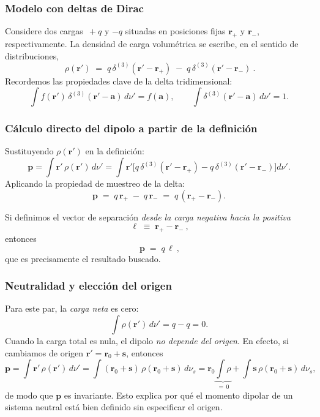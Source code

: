 \documentclass{article}
\begin{document}
\subsubsection*{Modelo con deltas de Dirac}
Considere dos cargas $\,+q$ y $-q$ situadas en posiciones fijas $\mathbf r_{+}$ y $\mathbf r_{-}$, respectivamente. La densidad de carga volumétrica se escribe, en el sentido de distribuciones,
\[
\boxed{\ \rho(\mathbf r') \;=\; q\,\delta^{(3)}(\mathbf r'-\mathbf r_{+})
\;-\; q\,\delta^{(3)}(\mathbf r'-\mathbf r_{-})\ }.
\]
Recordemos las propiedades clave de la delta tridimensional:
\[
\int f(\mathbf r')\,\delta^{(3)}(\mathbf r'-\mathbf a)\,d\nu' = f(\mathbf a),
\qquad
\int \delta^{(3)}(\mathbf r'-\mathbf a)\,d\nu' = 1.
\]

\subsubsection*{Cálculo directo del dipolo a partir de la definición}
Sustituyendo $\rho(\mathbf r')$ en la definición:
\[
\mathbf p
=\int \mathbf r'\,\rho(\mathbf r')\,d\nu'
=\int \mathbf r'\Big[q\,\delta^{(3)}(\mathbf r'-\mathbf r_{+})
- q\,\delta^{(3)}(\mathbf r'-\mathbf r_{-})\Big]d\nu'.
\]
Aplicando la propiedad de muestreo de la delta:
\[
\boxed{\ \mathbf p \;=\; q\,\mathbf r_{+}\;-\;q\,\mathbf r_{-}
\;=\; q\,(\mathbf r_{+}-\mathbf r_{-}).\ }
\]

Si definimos el vector de separación \emph{desde la carga negativa hacia la positiva}
\[
\boxed{\ \boldsymbol{\ell}\;\equiv\;\mathbf r_{+}-\mathbf r_{-}\ },
\]
entonces
\[
\boxed{\ \mathbf p\;=\;q\,\boldsymbol{\ell}\ },
\]
que es precisamente el resultado buscado.

\subsubsection*{Neutralidad y elección del origen}
Para este par, la \emph{carga neta} es cero:
\[
\int \rho(\mathbf r')\,d\nu'=q-q=0.
\]
Cuando la carga total es nula, el dipolo \emph{no depende del origen}.  
En efecto, si cambiamos de origen $\mathbf r'=\mathbf r_{0}+\mathbf s$, entonces
\[
\mathbf p=\int \mathbf r'\,\rho(\mathbf r')\,d\nu'
=\int (\mathbf r_{0}+\mathbf s)\,\rho(\mathbf r_{0}+\mathbf s)\,d\nu_s
=\mathbf r_{0}\underbrace{\int \rho}_{=\,0}
+\int \mathbf s\,\rho(\mathbf r_{0}+\mathbf s)\,d\nu_s,
\]
de modo que $\mathbf p$ es invariante. Esto explica por qué el momento dipolar de un sistema neutral está bien definido sin especificar el origen.
\end{document}
